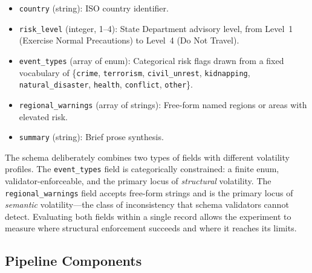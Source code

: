 \documentclass[sigconf]{acmart}
\begin{document}
\begin{itemize}
  \item \texttt{country} (string): ISO country identifier.
  \item \texttt{risk\_level} (integer, 1--4): State Department advisory level, from Level~1 (Exercise Normal Precautions) to Level~4 (Do Not Travel).
  \item \texttt{event\_types} (array of enum): Categorical risk flags drawn from a fixed vocabulary of \{\texttt{crime}, \texttt{terrorism}, \texttt{civil\_unrest}, \texttt{kidnapping}, \texttt{natural\_disaster}, \texttt{health}, \texttt{conflict}, \texttt{other}\}.
  \item \texttt{regional\_warnings} (array of strings): Free-form named regions or areas with elevated risk.
  \item \texttt{summary} (string): Brief prose synthesis.
\end{itemize}

The schema deliberately combines two types of fields with different volatility profiles. The \texttt{event\_types} field is categorically constrained: a finite enum, validator-enforceable, and the primary locus of \emph{structural} volatility. The \texttt{regional\_warnings} field accepts free-form strings and is the primary locus of \emph{semantic} volatility---the class of inconsistency that schema validators cannot detect. Evaluating both fields within a single record allows the experiment to measure where structural enforcement succeeds and where it reaches its limits.

\subsection{Pipeline Components}
\end{document}

